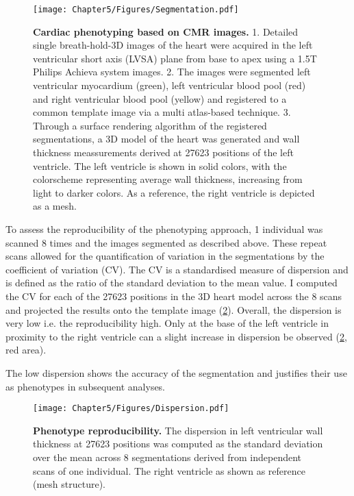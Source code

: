\begin{figure}[h]
	\centering
	\texttt{[image: Chapter5/Figures/Segmentation.pdf]}
	\caption[\textbf{Cardiac phenotyping based on CMR images. }]{\textbf{Cardiac phenotyping based on CMR images. } 1. Detailed single breath-hold-3D images of the heart were acquired in the left ventricular short axis (LVSA) plane from base to apex using a 1.5T Philips Achieva system images. 2. The images were segmented  left ventricular myocardium (green), left ventricular blood pool (red) and right ventricular blood pool (yellow) and registered to a common template image via a multi atlas-based technique. 3. Through a surface rendering algorithm of the registered segmentations, a 3D model of the heart was generated and wall thickness meassurements derived at \num{27623} positions of the left ventricle. The left ventricle is shown in solid colors, with the colorscheme representing average wall thickness, increasing from light to darker colors. As a reference, the right ventricle is depicted as a mesh.}
 	\label{fig:segmentation}
\end{figure}

To assess the reproducibility of the phenotyping approach, \num{1} individual was scanned \num{8} times and the images segmented as described above. These repeat scans allowed for the quantification of variation in the segmentations by the coefficient of variation (CV). The CV is a standardised measure of dispersion and is defined as the ratio of the standard deviation to the mean value. I computed the CV for each of the \num{27623} positions in the 3D heart model across the \num{8} scans and projected the results onto the template image (\cref{fig:reproducibility}). Overall, the dispersion is very low i.e. the reproducibility high. Only at the base of the left ventricle in proximity to the right ventricle can a slight increase in dispersion be observed (\cref{fig:reproducibility}, red area).  

The low dispersion shows the accuracy of the segmentation and justifies their use as phenotypes in subsequent analyses. 
\\ 

\begin{figure}[h]
	\centering
	\texttt{[image: Chapter5/Figures/Dispersion.pdf]}
	\caption[\textbf{Phenotype reproducibility. }]{\textbf{Phenotype reproducibility. }The dispersion in left ventricular wall thickness at \num{27623} positions was computed as the standard deviation over the mean across \num{8} segmentations derived from independent scans of one individual. The right ventricle as shown as reference (mesh structure). }
 	\label{fig:reproducibility}
\end{figure}
